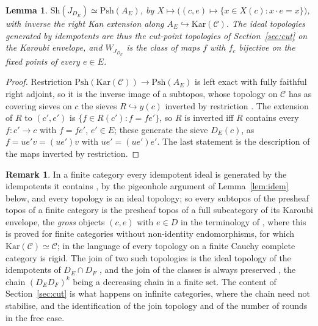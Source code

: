 \documentclass[11pt]{amsart}
\newtheorem{lem}[thm]{Lemma}
\theoremstyle{definition}
\newtheorem{rem}[thm]{Remark}
\newcommand{\Psh}{\mathrm{Psh}}
\newcommand{\Sh}{\mathrm{Sh}}
\begin{document}
\begin{lem}\label{lem:kar}
$\Sh(J_{D_E})\simeq\Psh(A_E)$, by $X\mapsto\big((c,e)\mapsto\{x\in
X(c):x\cdot e=x\}\big)$, with inverse the right Kan extension along
$A_E\hookrightarrow\mathrm{Kar}(\mathcal C)$. The ideal topologies
generated by idempotents are thus the cut-point topologies of
Section~\ref{sec:cut} on the Karoubi envelope, and $W_{J_{D_E}}$ is the
class of maps $f$ with $f_c$ bijective on the fixed points of every
$e\in E$.
\end{lem}
\begin{proof}
Restriction $\Psh(\mathrm{Kar}(\mathcal C))\to\Psh(A_E)$ is left exact
with fully faithful right adjoint, so it is the inverse image of a
subtopos, whose topology on $\mathcal C$ has as covering sieves on $c$
the sieves $R\hookrightarrow y(c)$ inverted by restriction
\cite[A4.3, A4.5]{Elephant}. The extension of $R$ to $(c',e')$ is
$\{f\in R(c'):f=fe'\}$, so $R$ is inverted iff $R$ contains every
$f\colon c'\to c$ with $f=fe'$, $e'\in E$; these generate the sieve
$D_E(c)$, as $f=ue'v=(ue')v$ with $ue'=(ue')e'$. The last statement is
the description of the maps inverted by restriction.
\end{proof}

\begin{rem}\label{rem:finite}
In a finite category every idempotent ideal is generated by the
idempotents it contains \cite[\S2]{Finitejoin}, by the pigeonhole
argument of Lemma~\ref{lem:idem} below, and every topology is an ideal
topology; so every subtopos of the presheaf topos of a finite category is
the presheaf topos of a full subcategory of its Karoubi envelope, the
\emph{gross} objects $(c,e)$ with $e\in D$ in the terminology of
\cite{Friedman}, where this is proved for finite categories without
non-identity endomorphisms, for which $\mathrm{Kar}(\mathcal C)\simeq
\mathcal C$; in the language of \cite{Marques25} every topology on a
finite Cauchy complete category is rigid. The join of two such topologies
is the ideal topology of the idempotents of $D_E\cap D_F$
\cite[\S2]{Finitejoin}, and the join of the classes is always preserved
\cite{Finitejoin,Stabjoin}, the chain $(D_ED_F)^k$ being a decreasing
chain in a finite set. The content of Section~\ref{sec:cut} is what
happens on infinite categories, where the chain need not stabilise, and
the identification of the join topology and of the number of rounds in
the free case.
\end{rem}
\end{document}
